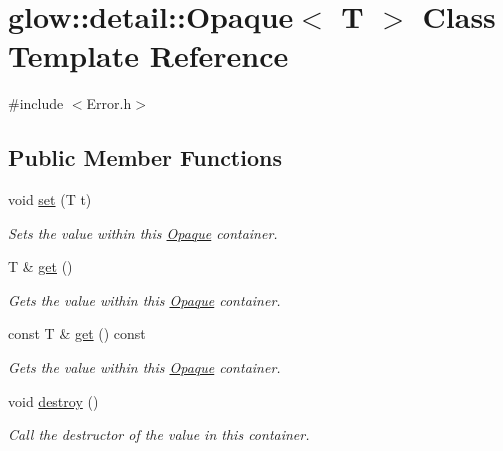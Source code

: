 \hypertarget{classglow_1_1detail_1_1_opaque}{}\section{glow\+:\+:detail\+:\+:Opaque$<$ T $>$ Class Template Reference}
\label{classglow_1_1detail_1_1_opaque}


{\ttfamily \#include $<$Error.\+h$>$}

\subsection*{Public Member Functions}
\begin{DoxyCompactItemize}
\item 
\mbox{\label{classglow_1_1detail_1_1_opaque_ad2b35217b91e6a6ec6a3c9d164c10a94}} 
void \hyperlink{classglow_1_1detail_1_1_opaque_ad2b35217b91e6a6ec6a3c9d164c10a94}{set} (T t)
\begin{DoxyCompactList}\small\item\em Sets the value within this \hyperlink{classglow_1_1detail_1_1_opaque}{Opaque} container. \end{DoxyCompactList}\item 
\mbox{\label{classglow_1_1detail_1_1_opaque_a949370ebbc63609039e6f096b5fec6f2}} 
T \& \hyperlink{classglow_1_1detail_1_1_opaque_a949370ebbc63609039e6f096b5fec6f2}{get} ()
\begin{DoxyCompactList}\small\item\em Gets the value within this \hyperlink{classglow_1_1detail_1_1_opaque}{Opaque} container. \end{DoxyCompactList}\item 
\mbox{\label{classglow_1_1detail_1_1_opaque_aa9ff0bad2f4eb17ca78ce978dc48605b}} 
const T \& \hyperlink{classglow_1_1detail_1_1_opaque_aa9ff0bad2f4eb17ca78ce978dc48605b}{get} () const
\begin{DoxyCompactList}\small\item\em Gets the value within this \hyperlink{classglow_1_1detail_1_1_opaque}{Opaque} container. \end{DoxyCompactList}\item 
\mbox{\label{classglow_1_1detail_1_1_opaque_a37e4e7cd281675522c2332c24b894003}} 
void \hyperlink{classglow_1_1detail_1_1_opaque_a37e4e7cd281675522c2332c24b894003}{destroy} ()
\begin{DoxyCompactList}\small\item\em Call the destructor of the value in this container. \end{DoxyCompactList}\end{DoxyCompactItemize}


